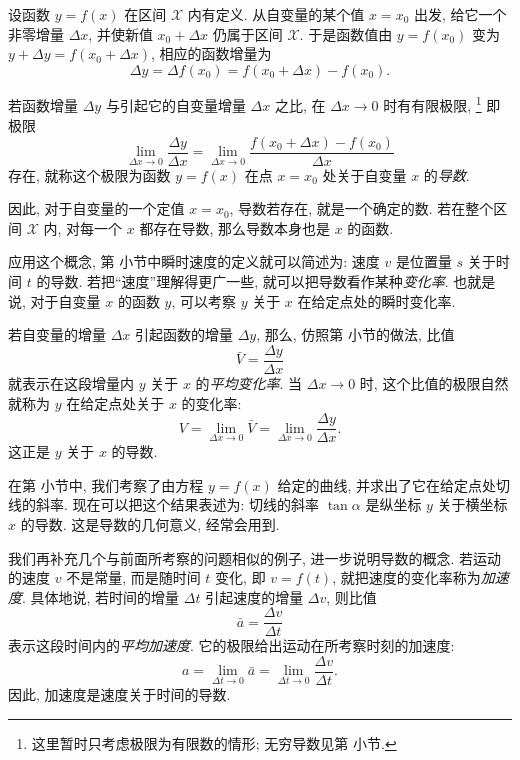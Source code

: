 设函数 $y=f(x)$ 在区间 $\mathcal{X}$ 内有定义.
从自变量的某个值 $x=x_0$ 出发, 给它一个非零增量 $\Delta x$,
并使新值 $x_0+\Delta x$ 仍属于区间 $\mathcal{X}$.
于是函数值由 $y=f(x_0)$ 变为 $y+\Delta y=f(x_0+\Delta x)$,
相应的函数增量为
$$
\Delta y=\Delta f(x_0)=f(x_0+\Delta x)-f(x_0).
$$

\label{def:derivative}
{\kaishu 若函数增量 $\Delta y$ 与引起它的自变量增量 $\Delta x$ 之比,
在 $\Delta x\to0$ 时有有限极限,
\footnote{这里暂时只考虑极限为有限数的情形; 无穷导数见第  小节.}
即极限
$$
\lim_{\Delta x\to0}\frac{\Delta y}{\Delta x}
=\lim_{\Delta x\to0}\frac{f(x_0+\Delta x)-f(x_0)}{\Delta x}
$$
存在, 就称这个极限为函数 $y=f(x)$ 在点 $x=x_0$ 处关于自变量 $x$ 的\emph{导数}.}

因此, 对于自变量的一个定值 $x=x_0$, 导数若存在, 就是一个确定的数.
若在整个区间 $\mathcal{X}$ 内, 对每一个 $x$ 都存在导数,
那么导数本身也是 $x$ 的函数.

应用这个概念, 第  小节中瞬时速度的定义就可以简述为:
{\kaishu 速度 $v$ 是位置量 $s$ 关于时间 $t$ 的导数.}
若把“速度”理解得更广一些, 就可以把导数看作某种\emph{变化率}.
也就是说, 对于自变量 $x$ 的函数 $y$, 可以考察 $y$ 关于 $x$ 在给定点处的瞬时变化率.

若自变量的增量 $\Delta x$ 引起函数的增量 $\Delta y$,
那么, 仿照第  小节的做法, 比值
$$
\bar V=\frac{\Delta y}{\Delta x}
$$
就表示在这段增量内 $y$ 关于 $x$ 的\emph{平均变化率}.
当 $\Delta x\to0$ 时, 这个比值的极限自然就称为 $y$ 在给定点处关于 $x$ 的变化率:
$$
V=\lim_{\Delta x\to0}\bar V
=\lim_{\Delta x\to0}\frac{\Delta y}{\Delta x}.
$$
这正是 $y$ 关于 $x$ 的导数.

在第  小节中, 我们考察了由方程 $y=f(x)$ 给定的曲线,
并求出了它在给定点处切线的斜率.
现在可以把这个结果表述为:
{\kaishu 切线的斜率 $\tan\alpha$ 是纵坐标 $y$ 关于横坐标 $x$ 的导数.}
这是导数的几何意义, 经常会用到.

我们再补充几个与前面所考察的问题相似的例子, 进一步说明导数的概念.
若运动的速度 $v$ 不是常量, 而是随时间 $t$ 变化, 即 $v=f(t)$,
就把速度的变化率称为\emph{加速度}.
具体地说, 若时间的增量 $\Delta t$ 引起速度的增量 $\Delta v$,
则比值
$$
\bar a=\frac{\Delta v}{\Delta t}
$$
表示这段时间内的\emph{平均加速度}.
它的极限给出运动在所考察时刻的加速度:
$$
a=\lim_{\Delta t\to0}\bar a
=\lim_{\Delta t\to0}\frac{\Delta v}{\Delta t}.
$$
因此, {\kaishu 加速度是速度关于时间的导数.}


